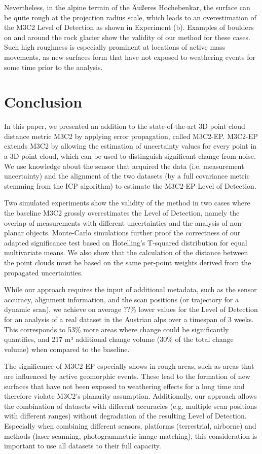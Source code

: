\documentclass[preprint,12pt,3p]{elsarticle}
\begin{document}
Nevertheless, in the alpine terrain of the Äußeres Hochebenkar, the surface can be quite rough at the projection radius scale, which leads to an overestimation of the M3C2 Level of Detection as shown in Experiment (b). Examples of boulders on and around the rock glacier show the validity of our method for these cases. Such high roughness is especially prominent at locations of active mass movements, as new surfaces form that have not exposed to weathering events for some time prior to the analysis.


\section{Conclusion}
In this paper, we presented an addition to the state-of-the-art 3D point cloud distance metric M3C2 by applying error propagation, called M3C2-EP. M3C2-EP extends M3C2 by allowing the estimation of uncertainty values for every point in a 3D point cloud, which can be used to distinguish significant change from noise. We use knowledge about the sensor that acquired the data (i.e. measurement uncertainty) and the alignment of the two datasets (by a full covariance metric stemming from the ICP algorithm) to estimate the M3C2-EP Level of Detection.

Two simulated experiments show the validity of the method in two cases where the baseline M3C2 grossly overestimates the Level of Detection, namely the overlap of measurements with different uncertainties and the analysis of non-planar objects. Monte-Carlo simulations further proof the correctness of our adapted significance test based on Hotelling’s T-squared distribution for equal multivariate means. We also show that the calculation of the distance between the point clouds must be based on the same per-point weights derived from the propagated uncertainties.

While our approach requires the input of additional metadata, such as the sensor accuracy, alignment information, and the scan positions (or trajectory for a dynamic scan), we achieve on average ??\% lower values for the Level of Detection for an analysis of a real dataset in the Austrian alps over a  timespan of 3 weeks. This corresponds to 53\% more areas where change could be significantly quantifies, and 217 m³ additional change volume (30\% of the total change volume) when compared to the baseline. 

The significance of M3C2-EP especially shows in rough areas, such as areas that are influenced by active geomorphic events. These lead to the formation of new surfaces that have not been exposed to weathering effects for a long time and therefore violate M3C2’s planarity assumption. Additionally, our approach allows the combination of datasets with different accuracies (e.g. multiple scan positions with different ranges) without degradation of the resulting Level of Detection. Especially when combining different sensors, platforms (terrestrial, airborne) and methods (laser scanning, photogrammetric image matching), this consideration is important to use all datasets to their full capacity.
\end{document}
